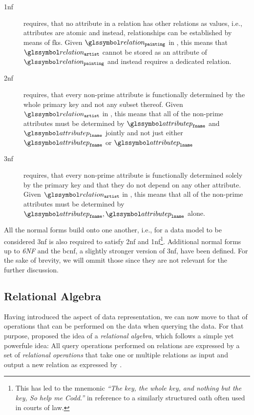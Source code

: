 \begin{description}
    \item[\acrfull{1nf}] requires, that no attribute in a relation has other relations as values, i.e., attributes are atomic and instead, relationships can be established by means of \acrshort{fk}s. Given $\relation_{\mathtt{painting}}$ in , this means that $\relation_{\mathtt{artist}}$ cannot be stored as an attribute of $\relation_{\mathtt{painting}}$ and instead requires a dedicated relation.
    \item[\acrfull{2nf}] requires, that every non-prime attribute is functionally determined by the whole primary key and not any subset thereof. Given $\relation_{\mathtt{artist}}$ in , this means that all of the non-prime attributes must be determined by $\attributep_{\mathtt{fname}}$ and $\attributep_{\mathtt{lname}}$ jointly and not just either $\attributep_{\mathtt{fname}}$ or $\attributep_{\mathtt{lname}}$ 
    \item[\acrfull{3nf}] requires, that every non-prime attribute is functionally determined solely by the primary key and that they do not depend on any other attribute. Given $\relation_{\mathtt{artist}}$ in , this means that all of the non-prime attributes must be determined by $\attributep_{\mathtt{fname}}, \attributep_{\mathtt{lname}}$ alone.
\end{description}

All the normal forms build onto one another, i.e., for a data model to be considered \acrshort{3nf} is also required to satisfy \acrshort{2nf}  and \acrshort{1nf}\footnote{This has led to the mnemonic \emph{``The key, the whole key, and nothing but the key, So help me Codd.''} in reference to a similarly structured oath often used in courts of law.}. Additional normal forms up to \emph{6NF} and the \acrfull{bcnf}, a slightly stronger version of \acrshort{3nf}, have been defined. For the sake of brevity, we will ommit those since they are not relevant for the further discussion.

\subsection{Relational Algebra}
\label{section:rel_algebra}

Having introduced the aspect of data representation, we can now move to that of operations that can be performed on the data when querying the data. For that purpose, \cite{Codd:1970Relational} proposed the idea of a \emph{relational algebra}, which follows a simple yet powerfule idea: All query operations performed on relations are expressed by a set of \emph{relational operations} that take one or multiple relations as input and output a new relation as expressed by .

